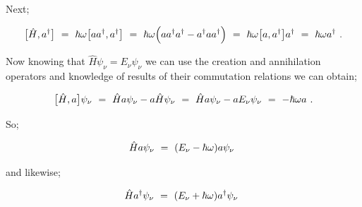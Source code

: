 \documentclass{article}
\begin{document}
Next; 

\begin{equation} \label{eq:256}
\big[ \hat{H} , a^{\dagger} \big] \hspace{0.125cm} = \hspace{0.125cm} \hbar \omega \big[ a a^{\dagger} , a^{\dagger} \big] \hspace{0.125cm} = \hspace{0.125cm} \hbar \omega \Big( a a^{\dagger} a^{\dagger} - a^{\dagger} a a^{\dagger} \Big) \hspace{0.125cm} = \hspace{0.125cm} \hbar \omega \big[ a , a^{\dagger} \big] a^{\dagger} \hspace{0.125cm} = \hspace{0.125cm} \hbar \omega a^{\dagger}\hspace{0.125cm} .
\end{equation}

Now knowing that \begin{math} \hat{H} \psi_{\nu} = E_\nu \psi_{\nu} \end{math} we can use the creation and annihilation operators and knowledge of results of their commutation relations we can obtain;

\begin{equation} \label{eq:256}
\big[ \hat{H} , a \big] \psi_\nu \hspace{0.125cm} = \hspace{0.125cm} \hat{H} a \psi_\nu - a \hat{H} \psi_\nu \hspace{0.125cm} = \hspace{0.125cm} \hat{H} a \psi_\nu - a E_\nu \psi_\nu \hspace{0.125cm} = \hspace{0.125cm} - \hbar \omega a \hspace{0.125cm} .
\end{equation}

So;

\begin{equation} \label{eq:256}
\hat{H} a \psi_\nu  \hspace{0.125cm} = \hspace{0.125cm} ( E_\nu - \hbar \omega ) a \psi_\nu  \hspace{0.125cm}
\end{equation}

and likewise;

\begin{equation} \label{eq:256}
\hat{H} a^{\dagger} \psi_\nu  \hspace{0.125cm} = \hspace{0.125cm} ( E_\nu + \hbar \omega ) a^{\dagger} \psi_\nu  \hspace{0.125cm}
\end{equation}
\end{document}
